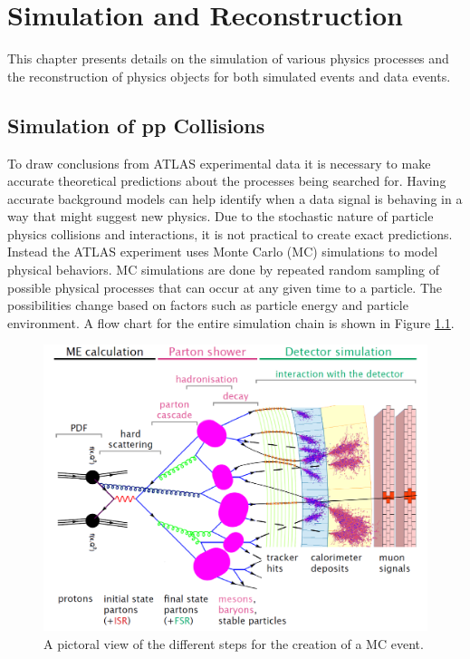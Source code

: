 \chapter{Simulation and Reconstruction}
\label{ch:Simulation}


This chapter presents details on the simulation of various physics processes and the reconstruction of physics objects for both simulated events and data events.  

\section{Simulation of pp Collisions}
To draw conclusions from ATLAS experimental data it is necessary to make accurate theoretical predictions about the processes being searched for.  Having accurate background models can help identify when a data signal is behaving in a way that might suggest new physics.  Due to the stochastic nature of particle physics collisions and interactions, it is not practical to create exact predictions.  Instead the ATLAS experiment uses Monte Carlo (MC) simulations to model physical behaviors.  MC simulations are done by repeated random sampling of possible physical processes that can occur at any given time to a particle.  The possibilities change based on factors such as particle energy and particle environment.  A flow chart for the entire simulation chain is shown in Figure \ref{fig:SimMCFlow}. 

\begin{figure}[h!]
	\centering
	\includegraphics[width=\columnwidth]{../ThesisImages/Simulation/MCFlow.png}
	\caption[A pictoral view of the different steps for the creation of a MC event.]{A pictoral view of the different steps for the creation of a MC event\cite{MaxThesis}.
	}
	\label{fig:SimMCFlow}
\end{figure}

